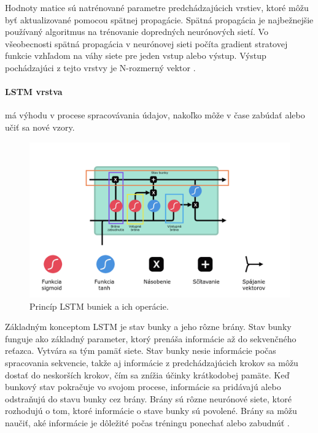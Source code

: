 Hodnoty matice sú natrénované parametre predchádzajúcich vrstiev, ktoré môžu byť aktualizované pomocou spätnej propagácie. Spätná propagácia je najbežnejšie používaný algoritmus na trénovanie dopredných neurónových sietí. Vo všeobecnosti spätná propagácia v neurónovej sieti počíta gradient stratovej funkcie vzhľadom na váhy siete pre jeden vstup alebo výstup. Výstup pochádzajúci z tejto vrstvy je N-rozmerný vektor \cite{dense}.

\paragraph{LSTM vrstva} má výhodu v procese spracovávania údajov, nakoľko môže v čase zabúdať alebo učiť sa nové vzory. 

\begin{figure}[!htbp]
  \centering
  \includegraphics[width=14cm]{img/lstm(1).png}
  \caption{Princíp LSTM buniek a ich operácie.}
  \label{lstm}
\end{figure}

Základným konceptom LSTM je stav bunky a jeho rôzne brány. Stav bunky funguje ako základný parameter, ktorý prenáša informácie až do sekvenčného reťazca. Vytvára sa tým pamäť siete. Stav bunky nesie informácie počas spracovania sekvencie, takže aj informácie z predchádzajúcich krokov sa môžu dostať do neskorších krokov, čím sa znížia účinky krátkodobej pamäte. Keď bunkový stav pokračuje vo svojom procese, informácie sa pridávajú alebo odstraňujú do stavu bunky cez brány. Brány sú rôzne neurónové siete, ktoré rozhodujú o tom, ktoré informácie o stave bunky sú povolené. Brány sa môžu naučiť, aké informácie je dôležité počas tréningu ponechať alebo zabudnúť \cite{lstm}.


